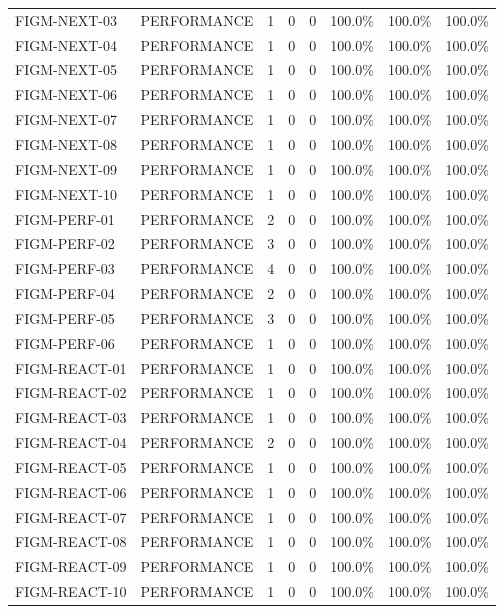 \begin{table}[htbp]
\begin{tabular}{llcccccc}
FIGM-NEXT-03 & PERFORMANCE & 1 & 0 & 0 & 100.0\% & 100.0\% & 100.0\% \\
FIGM-NEXT-04 & PERFORMANCE & 1 & 0 & 0 & 100.0\% & 100.0\% & 100.0\% \\
FIGM-NEXT-05 & PERFORMANCE & 1 & 0 & 0 & 100.0\% & 100.0\% & 100.0\% \\
FIGM-NEXT-06 & PERFORMANCE & 1 & 0 & 0 & 100.0\% & 100.0\% & 100.0\% \\
FIGM-NEXT-07 & PERFORMANCE & 1 & 0 & 0 & 100.0\% & 100.0\% & 100.0\% \\
FIGM-NEXT-08 & PERFORMANCE & 1 & 0 & 0 & 100.0\% & 100.0\% & 100.0\% \\
FIGM-NEXT-09 & PERFORMANCE & 1 & 0 & 0 & 100.0\% & 100.0\% & 100.0\% \\
FIGM-NEXT-10 & PERFORMANCE & 1 & 0 & 0 & 100.0\% & 100.0\% & 100.0\% \\
FIGM-PERF-01 & PERFORMANCE & 2 & 0 & 0 & 100.0\% & 100.0\% & 100.0\% \\
FIGM-PERF-02 & PERFORMANCE & 3 & 0 & 0 & 100.0\% & 100.0\% & 100.0\% \\
FIGM-PERF-03 & PERFORMANCE & 4 & 0 & 0 & 100.0\% & 100.0\% & 100.0\% \\
FIGM-PERF-04 & PERFORMANCE & 2 & 0 & 0 & 100.0\% & 100.0\% & 100.0\% \\
FIGM-PERF-05 & PERFORMANCE & 3 & 0 & 0 & 100.0\% & 100.0\% & 100.0\% \\
FIGM-PERF-06 & PERFORMANCE & 1 & 0 & 0 & 100.0\% & 100.0\% & 100.0\% \\
FIGM-REACT-01 & PERFORMANCE & 1 & 0 & 0 & 100.0\% & 100.0\% & 100.0\% \\
FIGM-REACT-02 & PERFORMANCE & 1 & 0 & 0 & 100.0\% & 100.0\% & 100.0\% \\
FIGM-REACT-03 & PERFORMANCE & 1 & 0 & 0 & 100.0\% & 100.0\% & 100.0\% \\
FIGM-REACT-04 & PERFORMANCE & 2 & 0 & 0 & 100.0\% & 100.0\% & 100.0\% \\
FIGM-REACT-05 & PERFORMANCE & 1 & 0 & 0 & 100.0\% & 100.0\% & 100.0\% \\
FIGM-REACT-06 & PERFORMANCE & 1 & 0 & 0 & 100.0\% & 100.0\% & 100.0\% \\
FIGM-REACT-07 & PERFORMANCE & 1 & 0 & 0 & 100.0\% & 100.0\% & 100.0\% \\
FIGM-REACT-08 & PERFORMANCE & 1 & 0 & 0 & 100.0\% & 100.0\% & 100.0\% \\
FIGM-REACT-09 & PERFORMANCE & 1 & 0 & 0 & 100.0\% & 100.0\% & 100.0\% \\
FIGM-REACT-10 & PERFORMANCE & 1 & 0 & 0 & 100.0\% & 100.0\% & 100.0\% \\

\end{tabular}
\end{table}
